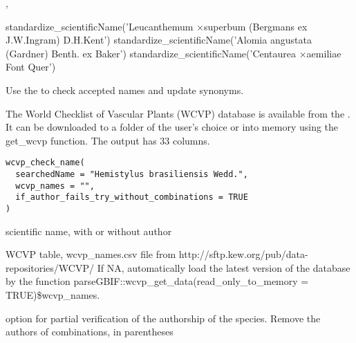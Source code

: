 \documentclass[a4paper]{book}
\begin{document}
%
\begin{SeeAlso}
, 
\end{SeeAlso}
%
\begin{Examples}
\begin{ExampleCode}

standardize_scientificName('Leucanthemum ×superbum (Bergmans ex J.W.Ingram) D.H.Kent')
standardize_scientificName('Alomia angustata (Gardner) Benth. ex Baker')
standardize_scientificName('Centaurea ×aemiliae Font Quer')


\end{ExampleCode}
\end{Examples}
%
\begin{Description}
Use the 
 to check accepted names and update synonyms.

The World Checklist of Vascular Plants (WCVP) database is available from the
.
It can be downloaded to a folder of the user’s choice or into memory using the get\_wcvp function. The output has 33 columns.
\end{Description}
%
\begin{Usage}
\begin{verbatim}
wcvp_check_name(
  searchedName = "Hemistylus brasiliensis Wedd.",
  wcvp_names = "",
  if_author_fails_try_without_combinations = TRUE
)
\end{verbatim}
\end{Usage}
%
\begin{Arguments}
\begin{ldescription}
\item[\code{searchedName}] scientific name, with or without author

\item[\code{wcvp\_names}] WCVP table, wcvp\_names.csv file from http://sftp.kew.org/pub/data-repositories/WCVP/ If NA, automatically load the latest version of the database by the function parseGBIF::wcvp\_get\_data(read\_only\_to\_memory = TRUE)\$wcvp\_names.

\item[\code{if\_author\_fails\_try\_without\_combinations}] option for partial verification of the authorship of the species. Remove the authors of combinations, in parentheses
\end{ldescription}
\end{Arguments}
\end{document}
